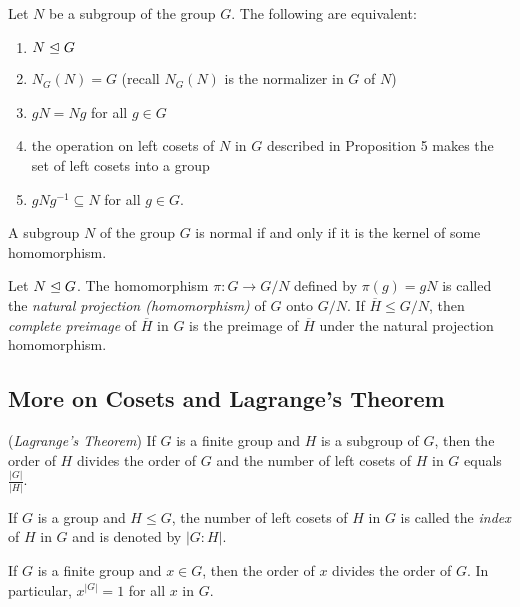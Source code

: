 \documentclass[../main]{subfiles}
\begin{document}
  
  \begin{thm}
   Let $N$ be a subgroup of the group $G$. The following are equivalent:
   \begin{enumerate}
    \item $N \trianglelefteq G$
    \item $N_G(N)=G$ (recall $N_G(N)$ is the normalizer in $G$ of $N$)
    \item $gN=Ng$ for all $g\in G$
    \item the operation on left cosets of $N$ in $G$ described in Proposition 5 makes the set of left cosets into a group
    \item $gNg^{-1} \subseteq N$ for all $g\in G$.
   \end{enumerate}
  \end{thm}
  
  
  \begin{prop}
   A subgroup $N$ of the group $G$ is normal if and only if it is the kernel of some homomorphism.
  \end{prop}
  
  
  \begin{dfn}
   Let $N \trianglelefteq G$. The homomorphism $\pi \colon G \to G/N$ defined by $\pi(g)=gN$ is called the \textit{natural projection (homomorphism)} of $G$ onto $G/N$. If $\overline{H} \leq G/N$, then \textit{complete preimage} of $\overline{H}$ in $G$ is the preimage of $\overline{H}$ under the natural projection homomorphism. 
  \end{dfn}
  
  
  \subsection{More on Cosets and Lagrange's Theorem}
  
  
  \begin{thm}
   (\textit{Lagrange's Theorem}) If $G$ is a finite group and $H$ is a subgroup of $G$, then the order of $H$ divides the order of $G$ and the number of left cosets of $H$ in $G$ equals $\frac{|G|}{|H|}$.
  \end{thm}
  
  
  \begin{dfn}
   If $G$ is a group and $H\leq G$, the number of left cosets of $H$ in $G$ is called the \textit{index} of $H$ in $G$ and is denoted by $|G:H|$.
  \end{dfn}
  
  
  \begin{cor}
   If $G$ is a finite group and $x\in G$, then the order of $x$ divides the order of $G$. In particular, $x^{|G|}=1$ for all $x$ in $G$.
  \end{cor}
  
\end{document}
